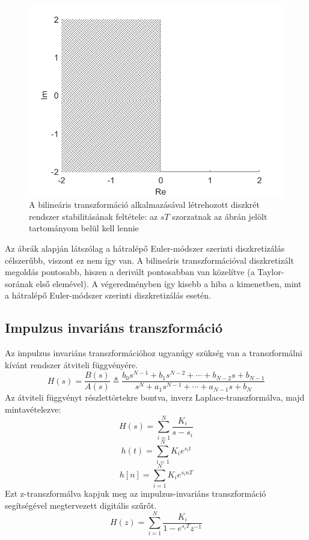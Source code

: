 \begin{figure}[H]
    \centering
    \includegraphics[scale=0.5]{figures/bilinearS.png}
    \caption{A bilineáris transzformáció alkalmazásával létrehozott diszkrét rendszer stabilitásának feltétele: az $sT$ szorzatnak az ábrán jelölt tartományom belül kell lennie}
\end{figure}
Az ábrák alapján látszólag a hátralépő Euler-módszer szerinti diszkretizálás célszerűbb, viszont ez nem így van. A bilineáris transzformációval diszkretizált megoldás pontosabb, hiszen a derivált pontosabban van közelítve (a Taylor-sorának első elemével). A végeredményben így kisebb a hiba a kimenetben, mint a hátralépő Euler-módszer szerinti diszkretizálás esetén.
\subsection{Impulzus invariáns transzformáció}

Az impulzus invariáns transzformációhoz ugyanúgy szükség van a transzformálni kívánt rendszer átviteli függvényére.
\begin{equation}
    H(s)=\frac{B(s)}{A(s)}\triangleq\frac{b_0s^{N-1}+b_1s^{N-2}+\cdots+b_{N-2}s+b_{N-1}}{s^N+a_1s^{N-1}+\cdots+a_{N-1}s+b_{N}}
\end{equation}
Az átviteli függvényt részlettörtekre bontva, inverz Laplace-transzformálva, majd mintavételezve:
\begin{equation}
    H(s)=\sum_{i=1}^{N}\frac{K_i}{s-s_i}
\end{equation}
\begin{equation}
    h(t)=\sum_{i=1}^{N}K_i e^{s_i t}
\end{equation}
\begin{equation}
    h[n]=\sum_{i=1}^{N}K_i e^{s_i nT}
\end{equation}
Ezt z-transzformálva kapjuk meg az impulzus-invariáns transzformáció segítségével megtervezett digitális 
szűrőt.
\begin{equation}
    H(z)=\sum_{i=1}^{N}\frac{K_i}{1-e^{s_i T}z^{-1}}
    \label{impinv}
\end{equation}


